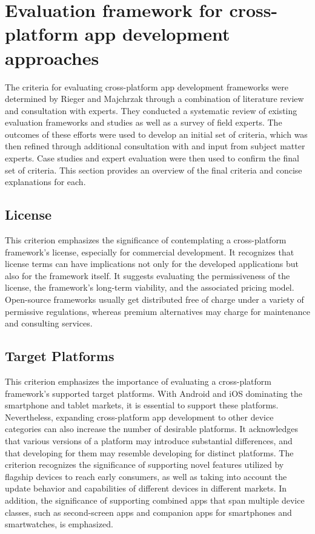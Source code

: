 \section{Evaluation framework for cross-platform app
development approaches}

The criteria for evaluating cross-platform app development frameworks were determined by Rieger and Majchrzak through a combination of literature review and consultation with experts. They conducted a systematic review of existing evaluation frameworks and studies as well as a survey of field experts. The outcomes of these efforts were used to develop an initial set of criteria, which was then refined through additional consultation with and input from subject matter experts. Case studies and expert evaluation were then used to confirm the final set of criteria.
This section provides an overview of the final criteria and concise explanations for each.

\subsection{License} 
This criterion emphasizes the significance of contemplating a cross-platform framework's license, especially for commercial development. It recognizes that license terms can have implications not only for the developed applications but also for the framework itself. It suggests evaluating the permissiveness of the license, the framework's long-term viability, and the associated pricing model. Open-source frameworks usually get distributed free of charge under a variety of permissive regulations, whereas premium alternatives may charge for maintenance and consulting services.

\subsection{Target Platforms} 
This criterion emphasizes the importance of evaluating a cross-platform framework's supported target platforms. With Android and iOS dominating the smartphone and tablet markets, it is essential to support these platforms. Nevertheless, expanding cross-platform app development to other device categories can also increase the number of desirable platforms. It acknowledges that various versions of a platform may introduce substantial differences, and that developing for them may resemble developing for distinct platforms. The criterion recognizes the significance of supporting novel features utilized by flagship devices to reach early consumers, as well as taking into account the update behavior and capabilities of different devices in different markets. In addition, the significance of supporting combined apps that span multiple device classes, such as second-screen apps and companion apps for smartphones and smartwatches, is emphasized.

